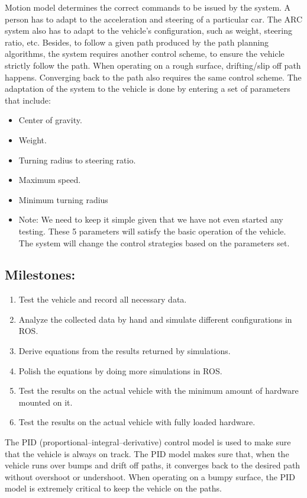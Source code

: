 \documentclass[compsoc,draftclsnofoot,onecolumn,10pt]{IEEEtran}
\begin{document}
Motion model determines the correct commands to be issued by the system. A person has to adapt to the acceleration and steering of a particular car. The ARC system also has to adapt to the vehicle’s configuration, such as weight, steering ratio, etc.
Besides, to follow a given path produced by the path planning algorithms, the system requires another control scheme, to ensure the vehicle strictly follow the path. When operating on a rough surface, drifting/slip off path happens. Converging back to the path also requires the same control scheme.
The adaptation of the system to the vehicle is done by entering a set of parameters that include:\par
\begin{itemize}
	\item Center of gravity.
	\item Weight.
	\item Turning radius to steering ratio.
	\item Maximum speed.
	\item Minimum turning radius
	\item Note: We need to keep it simple given that we have not even started any testing. These 5 parameters will satisfy the basic operation of the vehicle. The system will change the control strategies based on the parameters set.
\end{itemize}
\subsection{Milestones:}
\begin{enumerate}
	\item Test the vehicle and record all necessary data.
	\item Analyze the collected data by hand and simulate different configurations in ROS.
	\item Derive equations from the results returned by simulations.
	\item Polish the equations by doing more simulations in ROS.
	\item Test the results on the actual vehicle with the minimum amount of hardware mounted on it.
	\item Test the results on the actual vehicle with fully loaded hardware.
\end{enumerate}
The PID (proportional–integral–derivative) control model is used to make sure that the vehicle is always on track. The PID model makes sure that, when the vehicle runs over bumps and drift off paths, it converges back to the desired path without overshoot or undershoot. When operating on a bumpy surface, the PID model is extremely critical to keep the vehicle on the paths.\par
\end{document}
